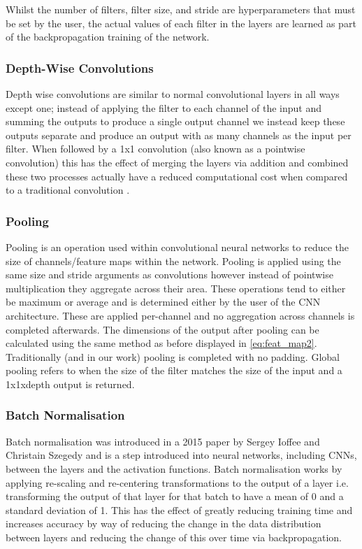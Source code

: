 \documentclass[12pt]{article}
\numberwithin{equation}{section}
\numberwithin{figure}{section}
\begin{document}
Whilst the number of filters, filter size, and stride are hyperparameters that must be set by the user, the actual values of each filter in the layers are learned as part of the backpropagation training of the network.


\subsubsection{Depth-Wise Convolutions}
Depth wise convolutions are similar to normal convolutional layers in all ways except one; instead of applying the filter to each channel of the input and summing the outputs to produce a single output channel we instead keep these outputs separate and produce an output with as many channels as the input per filter.  When followed by a 1x1 convolution (also known as a pointwise convolution) this has the effect of merging the layers via addition and combined these two processes actually have a reduced computational cost when compared to a traditional convolution \cite{Sandler2018}.

\subsubsection{Pooling}
Pooling is an operation used within convolutional neural networks to reduce the size of channels/feature maps within the network. Pooling is applied using the same size and stride arguments as convolutions however instead of pointwise multiplication they aggregate across their area. These operations tend to either be maximum or average and is determined either by the user of the CNN architecture. These are applied per-channel and no aggregation across channels is completed afterwards. The dimensions of the output after pooling can be calculated using the same method as before displayed in \cref{eq:feat_map2}. Traditionally (and in our work) pooling is completed with no padding. Global pooling refers to when the size of the filter matches the size of the input and a 1x1xdepth output is returned.

\subsubsection{Batch Normalisation}
Batch normalisation was introduced in a 2015 paper by Sergey Ioffee and Christain Szegedy\cite{Ioffe2015} and is a step introduced into neural networks, including CNNs, between the layers and the activation functions. Batch normalisation works by applying re-scaling and re-centering transformations to the output of a layer i.e. transforming the output of that layer for that batch to have a mean of 0 and a standard deviation of 1. This has the effect of greatly reducing training time and increases accuracy by way of reducing the change in the data distribution between layers and reducing the change of this over time via backpropagation. 
\end{document}
